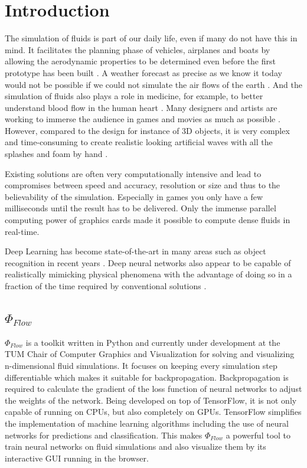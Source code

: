 \chapter{Introduction}\label{chapter:introduction}
The simulation of fluids is part of our daily life, even if many do not have this in mind. It facilitates the planning phase of vehicles, airplanes and boats by allowing the aerodynamic properties to be determined even before the first prototype has been built \parencite{tsubokura2009computational}. A weather forecast as precise as we know it today would not be possible if we could not simulate the air flows of the earth \parencite{kimura2002numerical}. And the simulation of fluids also plays a role in medicine, for example, to better understand blood flow in the human heart \parencite{peskin1977numerical}. Many designers and artists are working to immerse the audience in games and movies as much as possible \parencite{gilland2009elemental}. However, compared to the design for instance of 3D objects, it is very complex and time-consuming to create realistic looking artificial waves with all the splashes and foam by hand \parencite{gilland2009elemental}.
\par Existing solutions are often very computationally intensive and lead to compromises between speed and accuracy, resolution or size and thus to the believability of the simulation. Especially in games you only have a few milliseconds until the result has to be delivered. Only the immense parallel computing power of graphics cards made it possible to compute dense fluids in real-time. 
\par Deep Learning has become state-of-the-art in many areas such as object recognition in recent years \parencite{lecun2015deep}. Deep neural networks also appear to be capable of realistically mimicking physical phenomena with the advantage of doing so in a fraction of the time required by conventional solutions \parencite{tompson2017accelerating} \parencite{thuerey2018well}.
\section{$\Phi_\textit{Flow}$ }
$\Phi_\textit{Flow}$ is a toolkit written in Python and currently under development at the TUM Chair of Computer Graphics and Visualization for solving and visualizing n-dimensional fluid simulations. It focuses on keeping every simulation step differentiable which makes it suitable for backpropagation. Backpropagation is required to calculate the gradient of the loss function of neural networks to adjust the weights of the network. Being developed on top of TensorFlow, it is not only capable of running on CPUs, but also completely on GPUs. TensorFlow simplifies the implementation of machine learning algorithms including the use of neural networks for predictions and classification. This makes $\Phi_\textit{Flow}$ a powerful tool to train neural networks on fluid simulations and also visualize them by its interactive GUI running in the browser. 
